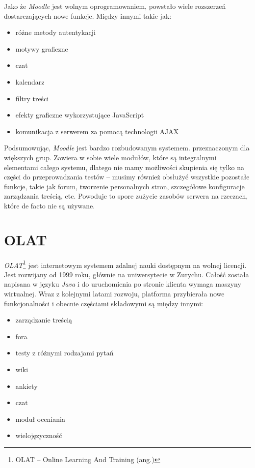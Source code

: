 \documentclass[12pt,twoside]{report}
\begin{document}
Jako że \emph{Moodle} jest wolnym oprogramowaniem, powstało wiele rozszerzeń
dostarczających nowe funkcje. Między innymi takie jak:

\begin{itemize}
  \item{różne metody autentykacji}
  \item{motywy graficzne}
  \item{czat}
  \item{kalendarz}
  \item{filtry treści}
  \item{efekty graficzne wykorzystujące JavaScript}
  \item{komunikacja z serwerem za pomocą technologii AJAX}
\end{itemize}


Podsumowując, \emph{Moodle} jest bardzo rozbudowanym systemem. przeznaczonym dla większych
grup. Zawiera w sobie wiele modułów, które są integralnymi elementami całego systemu, dlatego
nie mamy możliwości skupienia się tylko na części do przeprowadzania testów -- musimy
również obsłużyć wszystkie pozostałe funkcje, takie jak forum, tworzenie personalnych
stron, szczegółowe konfiguracje zarządzania treścią, etc. Powoduje to spore zużycie
zasobów serwera na rzeczach, które de facto nie są używane.

\section{OLAT}
\emph{OLAT}\footnote{OLAT -- Online Learning And Training (ang.)} jest internetowym
systemem zdalnej nauki dostępnym na wolnej licencji. Jest rozwijany od 1999 roku, głównie
na uniwersytecie w Zurychu. Całość została napisana w języku \emph{Java} i do uruchomienia
po stronie klienta wymaga maszyny wirtualnej. Wraz z kolejnymi latami rozwoju, platforma
przybierała nowe funkcjonalności i obecnie częściami składowymi są między innymi:

\begin{itemize}
  \item{zarządzanie treścią}
  \item{fora}
  \item{testy z różnymi rodzajami pytań}
  \item{wiki}
  \item{ankiety}
  \item{czat}
  \item{moduł oceniania}
  \item{wielojęzyczność}
\end{itemize}
\end{document}
